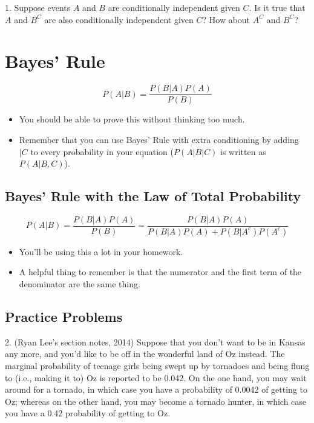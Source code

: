 \documentclass{article}
\begin{document}


1. Suppose events $A$ and $B$ are conditionally independent given $C$. Is it true that $A$ and $B^C$ are also conditionally independent given $C$? How about $A^C$ and $B^C$?


\section{Bayes' Rule}

$$P(A|B) = \frac{P(B|A)P(A)}{P(B)}$$
\begin{itemize}
    \item You should be able to prove this without thinking too much.
    \item Remember that you can use Bayes' Rule with extra conditioning by adding $|C$ to every probability in your equation ($P(A|B|C)$ is written as $P(A|B, C)$).
\end{itemize}

\subsection{Bayes' Rule with the Law of Total Probability}

$$P(A|B) = \frac{P(B|A)P(A)}{P(B)} = \frac{P(B|A)P(A)}{P(B|A)P(A) + P(B|A^c)P(A^c)}$$

\begin{itemize}
    \item You'll be using this a lot in your homework.
    \item A helpful thing to remember is that the numerator and the first term of the denominator are the same thing.
\end{itemize}

\subsection{Practice Problems}

2. (Ryan Lee's section notes, 2014) Suppose that you don't want to be in Kansas any more, and you'd like to be off in the wonderful land of Oz instead. The marginal probability of teenage girls being swept up by tornadoes and being flung to (i.e., making it to) Oz is reported to be 0.042. On the one hand, you may wait around for a tornado, in which case you have a probability of 0.0042 of getting to Oz; whereas on the other hand, you may become a tornado hunter, in which case you have a 0.42 probability of getting to Oz.
\end{document}
